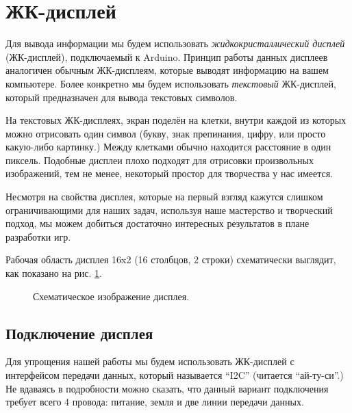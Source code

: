 \documentclass[../sparc.tex]{subfiles}
\begin{document}
\section{ЖК-дисплей}

Для вывода информации мы будем использовать \emph{жидкокристаллический дисплей}
(ЖК-дисплей), подключаемый к Arduino.  Принцип работы данных дисплеев аналогичен
обычным ЖК-дисплеям, которые выводят информацию на вашем компьютере.  Более
конкретно мы будем использовать \emph{текстовый} ЖК-дисплей, который
предназначен для вывода текстовых символов.

На текстовых ЖК-дисплеях, экран поделён на клетки, внутри каждой из которых
можно отрисовать один символ (букву, знак препинания, цифру, или просто
какую-либо картинку.)  Между клетками обычно находится расстояние в один
пиксель.  Подобные дисплеи плохо подходят для отрисовки произвольных
изображений, тем не менее, некоторый простор для творчества у нас имеется.

Несмотря на свойства дисплея, которые на первый взгляд кажутся слишком
ограничивающими для наших задач, используя наше мастерство и творческий подход,
мы можем добиться достаточно интересных результатов в плане разработки игр.

Рабочая область дисплея 16x2 (16 столбцов, 2 строки) схематически выглядит, как
показано на рис. \ref{fig:lcd-schematics}.

\begin{figure}[ht]
  \centering
  \caption{Схематическое изображение дисплея.}
  \label{fig:lcd-schematics}
\end{figure}

\subsection{Подключение дисплея}

Для упрощения нашей работы мы будем использовать ЖК-дисплей с интерфейсом
передачи данных, который называется ``I2C'' (читается ``ай-ту-си''.)  Не
вдаваясь в подробности можно сказать, что данный вариант подключения требует
всего 4 провода: питание, земля и две линии передачи данных.
\end{document}
